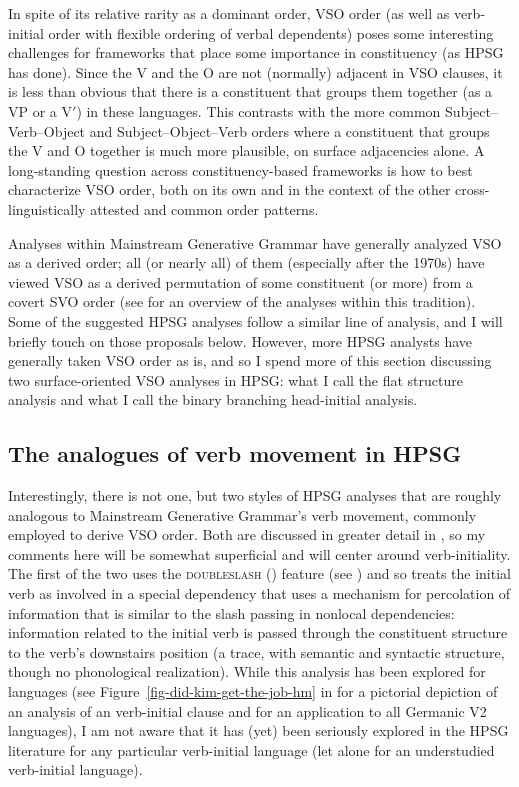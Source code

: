 \documentclass[output=paper,biblatex,babelshorthands,newtxmath,draftmode,colorlinks,citecolor=brown]{langscibook}
\begin{document}
\largerpage[-1]
In spite of its relative rarity as a dominant order, VSO order (as well as verb-initial order with flexible ordering of verbal dependents) poses some interesting challenges for frameworks that place some importance in constituency (as HPSG has done). Since the V and the O are not (normally) adjacent in VSO clauses, it is less than obvious that there is a constituent that groups them together (as a VP or a V$'$) in these languages. This contrasts with the more common Subject--Verb--Object and Subject--Object--Verb orders where a constituent that groups the V and O together is much more plausible, on surface adjacencies alone. A long-standing question across constituency-based frameworks is how to best characterize VSO order, both on its own and in the context of the other cross-linguistically attested and common order patterns.  

Analyses within Mainstream Generative Grammar have generally analyzed VSO as a derived order; all (or nearly all) of them (especially after the 1970s) have viewed VSO as a derived permutation of some constituent (or more) from a covert SVO order (see \citealt{clemenspolinsky17} for an overview of the analyses within this tradition). Some of the suggested HPSG analyses follow a similar line of analysis, and I will briefly touch on those proposals below. However, more HPSG analysts have generally taken VSO order as is, and so I spend more of this section discussing two surface-oriented VSO analyses in HPSG: what I call the flat structure analysis and what I call the binary branching head-initial analysis.  

\subsection{The analogues of verb movement in HPSG}

Interestingly, there is not one, but two styles of HPSG analyses that are roughly analogous to
Mainstream Generative Grammar's verb movement, commonly employed to derive VSO order. Both are
discussed in greater detail in , so my comments here will be somewhat
superficial and will center around verb-initiality. The first of the two uses the
\textsc{doubleslash} (\dsl{}) feature (see
) and so treats the initial verb as
involved in a special dependency that uses a mechanism for percolation of information that is
similar to the slash passing in nonlocal dependencies: information related to the initial verb is
passed through the constituent structure to the verb's downstairs position (a trace, with semantic
and syntactic structure, though no phonological realization). While this analysis has been explored
for  languages (see Figure~\ref{fig-did-kim-get-the-job-hm} in
 for a pictorial depiction of an analysis of an  verb-initial
clause and  for an application to all Germanic V2 languages), I am
not aware that it has (yet) been seriously explored in the HPSG literature for any particular
verb-initial language (let alone for an understudied verb-initial language).
\end{document}
